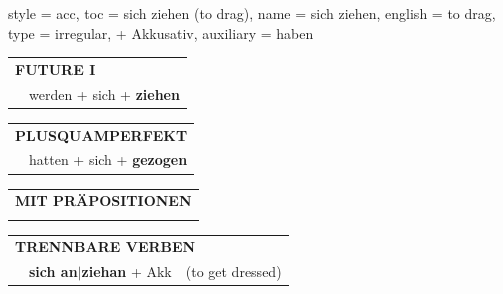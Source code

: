 \begin{verbentry}{
  style = {acc},
  toc = {sich ziehen (to drag)},
  name = {sich ziehen},
  english = {to drag},
  type = {irregular, + Akkusativ},
  auxiliary = {haben}
}
\begin{tabular}{rl}
    \multicolumn{2}{l}{\textbf{FUTURE I} }\\
    &werden + sich + \textbf{ziehen}\\
 
  \end{tabular}
\hfill
   \begin{tabular}{rl}
      \multicolumn{2}{l}{\textbf{PLUSQUAMPERFEKT}}\\
    &hatten + sich + \textbf{gezogen}\\
  \end{tabular}
  
\vspace{10pt}

   \begin{tabular}{lll}
      \multicolumn{3}{l}{\textbf{MIT PRÄPOSITIONEN}}\\
\vspace{0pt}
  \end{tabular}
  \hfill
   \begin{tabular}{lll}
    \multicolumn{3}{l}{\textbf{TRENNBARE VERBEN}}\\
& \textbf{sich an$|$ziehan} + Akk & (to get dressed)
 \end{tabular}
  
  \vspace{-5pt}
\end{verbentry}

